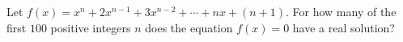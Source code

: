 Let $f(x)=x^n+2x^{n-1}+3x^{n-2}+\cdots+nx+(n+1)$. For how many of the first $100$ positive integers $n$ does the equation $f(x)=0$ have a real solution?
